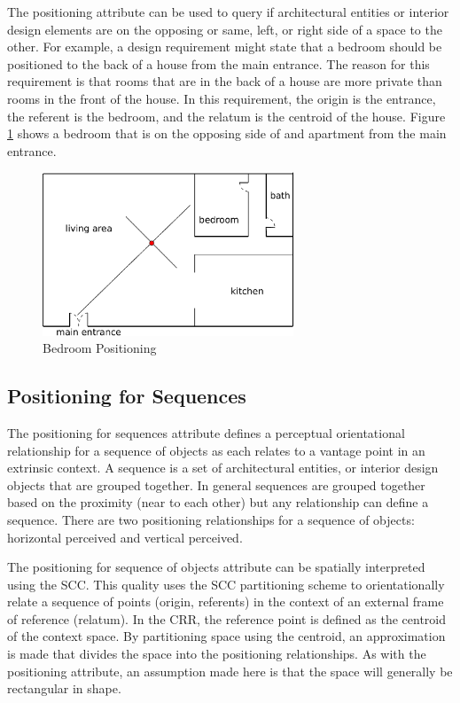 \documentclass[12pt]{ucthesis}
\begin{document}
The positioning attribute can be used to query if architectural entities or interior design elements are on the opposing or same, left, or right side of a space to the other. For example, a design requirement might state that a bedroom should be positioned to the back of a house from the main entrance. The reason for this requirement is that rooms that are in the back of a house are more private than rooms in the front of the house. In this requirement, the origin is the entrance, the referent is the bedroom, and the relatum is the centroid of the house. Figure \ref{bedroom-positioning} shows a bedroom that is on the opposing side of and apartment from the main entrance. 
\begin{figure}[t]
 \centering
 \includegraphics[width=75mm]{bedroom-back-house}
 \caption{Bedroom Positioning}
\label{bedroom-positioning}
\end{figure}



\subsection{Positioning for Sequences}
The positioning for sequences attribute defines a perceptual orientational relationship for a sequence of objects as each relates to a vantage point in an extrinsic context. A sequence is a set of architectural entities, or interior design objects that are grouped together. In general sequences are grouped together based on the proximity (near to each other) but any relationship can define a sequence. There are two positioning relationships for a sequence of objects: horizontal perceived and vertical perceived.  

The positioning for sequence of objects attribute can be spatially interpreted using the SCC. This quality uses the SCC partitioning scheme to orientationally relate a sequence of points (origin, referents) in the context of an external frame of reference (relatum). In the CRR, the reference point is defined as the centroid of the context space. By partitioning space using the centroid, an approximation is made that divides the space into the positioning relationships. As with the positioning attribute, an assumption made here is that the space will generally be rectangular in shape.
\end{document}
